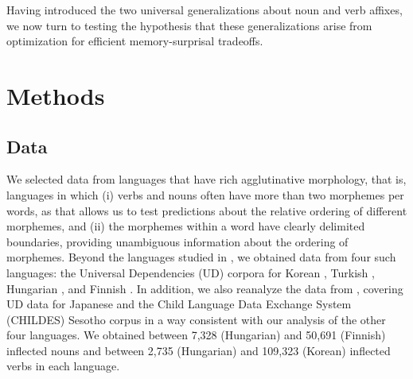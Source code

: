 \documentclass[11pt,letterpaper]{article}
\newcommand{\citep}{\parencite}
\newcommand{\citet}{\Textcite}
\newcommand{\jd}[1]{\textcolor{Pink}{[jd: #1]}}
\begin{document}
Having introduced the two universal generalizations about noun and verb affixes, we now turn to testing the hypothesis that these generalizations arise from optimization for efficient memory-surprisal tradeoffs.






\section{Methods}

\subsection{Data} 
We selected data from languages that have rich agglutinative morphology, that is, languages in which (i) verbs and nouns often have more than two morphemes per words, as that allows us to test predictions about the relative ordering of different morphemes, and (ii) the morphemes within a word have clearly delimited boundaries, providing unambiguous information about the ordering of morphemes.
Beyond the languages studied in \citet{Hahn2020modeling}, we obtained data from four such languages: the Universal Dependencies (UD) corpora for Korean \citep{chun2018building}, Turkish \citep{turkish-imst}, Hungarian \citep{hungarian-szeged}, and Finnish \citep{UDFinnish-TDT}.
In addition, we also reanalyze the data from \citet{Hahn2020modeling}, covering UD data for Japanese \citep{asahara2018universal} and the Child Language Data Exchange System (CHILDES) Sesotho corpus \citep{demuth1992acquisition} in a way consistent with our analysis of the other four languages.
We obtained between 7,328 (Hungarian) and 50,691 (Finnish) inflected nouns and between 2,735 (Hungarian) and 109,323 (Korean) inflected verbs in each language.
\end{document}
